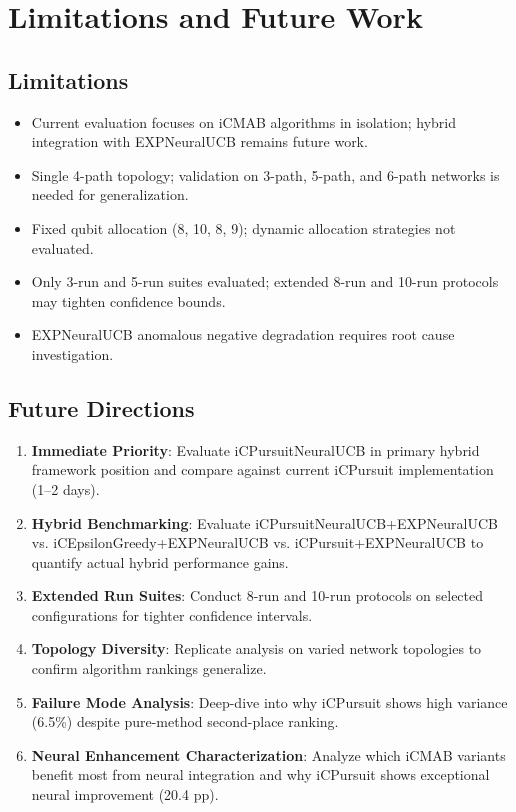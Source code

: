 \documentclass[12pt,a4paper]{article}
\begin{document}
\section{Limitations and Future Work}

\subsection{Limitations}
\begin{itemize}
\item Current evaluation focuses on iCMAB algorithms in isolation; hybrid integration with EXPNeuralUCB remains future work.
\item Single 4-path topology; validation on 3-path, 5-path, and 6-path networks is needed for generalization.
\item Fixed qubit allocation (8, 10, 8, 9); dynamic allocation strategies not evaluated.
\item Only 3-run and 5-run suites evaluated; extended 8-run and 10-run protocols may tighten confidence bounds.
\item EXPNeuralUCB anomalous negative degradation requires root cause investigation.
\end{itemize}

\subsection{Future Directions}
\begin{enumerate}
\item \textbf{Immediate Priority}: Evaluate iCPursuitNeuralUCB in primary hybrid framework position and compare against current iCPursuit implementation (1--2 days).
\item \textbf{Hybrid Benchmarking}: Evaluate iCPursuitNeuralUCB+EXPNeuralUCB vs. iCEpsilonGreedy+EXPNeuralUCB vs. iCPursuit+EXPNeuralUCB to quantify actual hybrid performance gains.
\item \textbf{Extended Run Suites}: Conduct 8-run and 10-run protocols on selected configurations for tighter confidence intervals.
\item \textbf{Topology Diversity}: Replicate analysis on varied network topologies to confirm algorithm rankings generalize.
\item \textbf{Failure Mode Analysis}: Deep-dive into why iCPursuit shows high variance (6.5\%) despite pure-method second-place ranking.
\item \textbf{Neural Enhancement Characterization}: Analyze which iCMAB variants benefit most from neural integration and why iCPursuit shows exceptional neural improvement (20.4 pp).
\end{enumerate}
\end{document}
